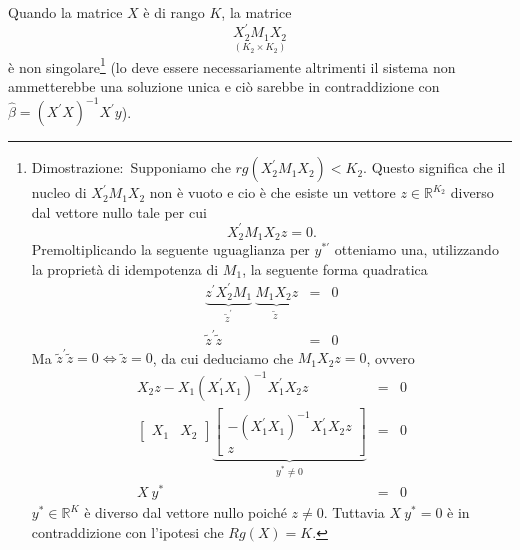 \documentclass[a4paper]{report}
\theoremstyle{remark}
\begin{document}
\noindent Quando la matrice $X$ \`{e} di rango $K$, la matrice%
\begin{equation*}
\underset{\left( K_{2}\times K_{2}\right) }{X_{2}^{\prime }M_{1}X_{2}}
\end{equation*}%
\`{e} non singolare\footnote{%
Dimostrazione:\ Supponiamo che $rg(X_{2}^{\prime }M_{1}X_{2})<K_{2}$. Questo
significa che il nucleo di $X_{2}^{\prime }M_{1}X_{2}$ non \`{e} vuoto e cio%
\`{e} che esiste un vettore $z\in \mathbb{R}^{K_{2}}$ diverso dal vettore
nullo tale per cui 
\begin{equation*}
X_{2}^{\prime }M_{1}X_{2}z=0.
\end{equation*}%
Premoltiplicando la seguente uguaglianza per $y^{\ast \prime }$ otteniamo
una, utilizzando la propriet\`{a} di idempotenza di $M_{1}$, la seguente
forma quadratica%
\begin{eqnarray*}
\underset{\widetilde{z}^{\prime }}{\underbrace{z^{\prime }X_{2}^{\prime
}M_{1}}}\underset{\widetilde{z}}{\ \underbrace{M_{1}X_{2}z}} &=&0 \\
\widetilde{z}^{\prime }\widetilde{z} &=&0
\end{eqnarray*}%
Ma $\widetilde{z}^{\prime }\widetilde{z}=0\Leftrightarrow \widetilde{z}=0$,
da cui deduciamo che $M_{1}X_{2}z=0$, ovvero%
\begin{eqnarray*}
X_{2}z-X_{1}\left( X_{1}^{\prime }X_{1}\right) ^{-1}X_{1}^{\prime }X_{2}z
&=&0 \\
\left[ 
\begin{array}{cc}
X_{1} & X_{2}%
\end{array}%
\right] \underset{y^{\ast }\neq 0}{\underbrace{\left[ 
\begin{array}{c}
-\left( X_{1}^{\prime }X_{1}\right) ^{-1}X_{1}^{\prime }X_{2}z \\ 
z%
\end{array}%
\right] }} &=&0 \\
X\ y^{\ast } &=&0
\end{eqnarray*}%
$y^{\ast }\in \mathbb{R}^{K}$ \`{e} diverso dal vettore nullo poich\'{e} $%
z\neq 0$. Tuttavia $X\ y^{\ast }=0$ \`{e} in contraddizione con l'ipotesi
che $Rg(X)=K$.
\par
{}} (lo deve essere necessariamente altrimenti il sistema non ammetterebbe
una soluzione unica e ci\`{o} sarebbe in contraddizione con $\widehat{\beta }%
=\left( X^{\prime }X\right) ^{-1}X^{\prime }y$).
\end{document}
